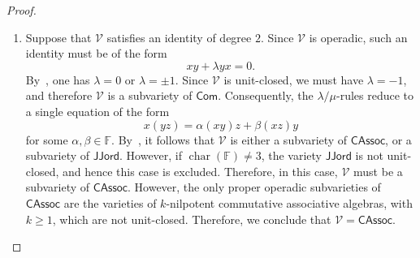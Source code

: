 \documentclass[reqno,a4paper]{amsart}
\theoremstyle{plain}
\theoremstyle{definition}
\theoremstyle{remark}
\numberwithin{equation}{section}
\newcommand{\F}{\mathbb{F}}
\newcommand{\V}{\mathcal{V}}
\DeclareMathOperator{\bchar}{char}
\newcommand{\CAssoc}{\ensuremath{\mathsf{CAssoc}}}
\newcommand{\Com}{\ensuremath{\mathsf{Com}}}
\newcommand{\JJord}{\ensuremath{\mathsf{JJord}}}
\begin{document}
\begin{proof}{\ }
\begin{enumerate}
\item Suppose that $\V$ satisfies an identity of degree $2$. Since $\V$ is operadic, such an identity must be of the form
\[
xy+\lambda yx=0.
\]
By~\cite[Proposition 1.3]{Tim}, one has $\lambda=0$ or $\lambda=\pm 1$. Since $\V$ is unit-closed, we must have $\lambda=-1$, and therefore $\V$ is a subvariety of $\Com$. Consequently, the $\lambda/\mu$-rules reduce to a single equation of the form
\[
x(yz)=\alpha(xy)z+\beta(xz)y
\]
for some $\alpha,\beta \in \F$. By~\cite[Proposition~2.1]{WRAAlg}, it follows that $\V$ is either a subvariety of $\CAssoc$, or a subvariety of $\JJord$. However, 
if $\bchar(\F)\neq 3$, the variety $\JJord$ is not unit-closed, and hence this case is excluded. Therefore, in this case, $\V$ must be a subvariety of $\CAssoc$. However, the only proper operadic subvarieties of $\CAssoc$ are the varieties of $k$-nilpotent commutative associative algebras, with $k \geq 1$,  
which are not unit-closed. Therefore, we conclude that $\V = \CAssoc$.


\end{enumerate}
\end{proof}
\end{document}
